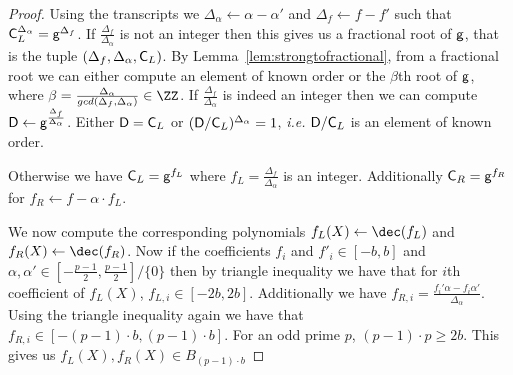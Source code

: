 \documentclass{article}
\theoremstyle{definition}
\begin{document}
\begin{proof}
	Using the transcripts we $\Delta_\alpha\gets\alpha-\alpha'$ and $\Delta_f\gets f-f'$ such that $\mathsf{C}_{L}^{\Delta_\alpha}=\mathsf{g}^{\Delta_f}$. 
 If $\frac{\Delta_f}{\Delta_\alpha}$ is not an integer then this gives us a fractional root of $\mathsf{g}$, that is the tuple $(\Delta_f,\Delta_\alpha,\mathsf{C}_{L})$. By Lemma~\ref{lem:strongtofractional}, from a fractional root we can either compute an element of known order or the $\beta$th root of $\mathsf{g}$, where $\beta = \frac{\Delta_\alpha}{gcd(\Delta_f,\Delta_\alpha)}\in \ZZ$.  
 If $\frac{\Delta_f}{\Delta_\alpha}$ is indeed an integer then we can compute $\mathsf{D}\gets\mathsf{g}^{\frac{\Delta_f}{\Delta_\alpha}}$. Either $\mathsf{D}=\mathsf{C}_{L}$ or $(\mathsf{D}/\mathsf{C}_{L})^{\Delta_\alpha}=1$, \emph{i.e.} $\mathsf{D}/\mathsf{C}_{L}$ is an element of known order.
  
  Otherwise we have $\mathsf{C}_{L}=\mathsf{g}^{f_L}$ where $f_L=\frac{\Delta_f}{\Delta_\alpha}$ is an integer.
Additionally $\mathsf{C}_R=\mathsf{g}^{f_R}$ for $f_R\gets f-\alpha \cdot f_L$.  

We now compute the corresponding polynomials $f_L(X)\gets \dec(f_L)$ and $f_R(X)\gets \dec(f_R)$.
Now if the coefficients $f_i$ and $f'_i\in [-b,b]$ and $\alpha,\alpha' \in [-\frac{p-1}{2},\frac{p-1}{2}]/\{0\}$ then by triangle inequality we have that for $i$th coefficient of $f_L(X)$, $f_{L,i}\in [-2b,2b]$. Additionally we have $f_{R,i}=\frac{f_i'\alpha-f_i \alpha'}{\Delta_\alpha}$. Using the triangle inequality again we have that $f_{R,i} \in [-(p-1) \cdot b, (p-1) \cdot b]$. For an odd prime $p$, $(p-1)\cdot p\geq 2b$. This gives us $f_L(X),f_R(X)\in B_{(p-1) \cdot b}$
\end{proof}
\end{document}
